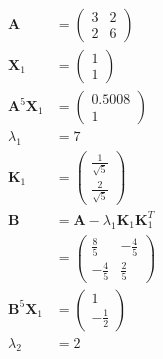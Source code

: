 \documentclass{article}
\begin{document}
\setcounter{subsubsection}{6}
\subsubsection{}

\begin{align*}
  \mathbf{A}                & = \begin{pmatrix}
                                  3 & 2 \\
                                  2 & 6
                                \end{pmatrix}                                     \\
  \mathbf{X}_1              & = \begin{pmatrix}
                                  1 \\
                                  1
                                \end{pmatrix}                                     \\
  \mathbf{A}^5 \mathbf{X}_1 & = \begin{pmatrix}
                                  0.5008 \\
                                  1
                                \end{pmatrix}                                     \\
  \lambda_1                 & = 7                                                  \\
  \mathbf{K}_1              & = \begin{pmatrix}
                                  \frac{1}{\sqrt{5}} \\
                                  \frac{2}{\sqrt{5}}
                                \end{pmatrix}                    \\
  \mathbf{B}                & = \mathbf{A} - \lambda_1 \mathbf{K}_1 \mathbf{K}_1^T \\
                            & = \begin{pmatrix}
                                  \frac{8}{5}  & -\frac{4}{5} \\
                                  -\frac{4}{5} & \frac{2}{5}
                                \end{pmatrix}                        \\
  \mathbf{B}^5 \mathbf{X}_1 & = \begin{pmatrix}
                                  1 \\
                                  -\frac{1}{2}
                                \end{pmatrix}                                     \\
  \lambda_2                 & = 2
\end{align*}
\end{document}
